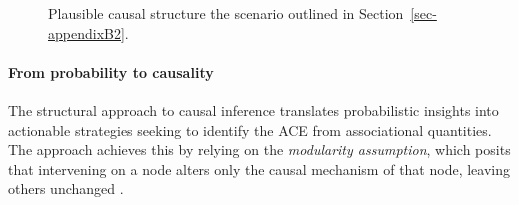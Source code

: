 \documentclass[
  authoryear,
  review,
  1p]{elsarticle}
\let\oldparagraph\paragraph
\renewcommand{\paragraph}[1]{\oldparagraph{#1}\mbox{}}
\begin{document}
\begin{figure}

\begin{minipage}{0.50\linewidth}

\centering{

\[
\begin{aligned}
  X & := x \\
  T & := f_{T}(x,e_{T}) \\
  Y & := f_{Y}(T,x,e_{Y}) \\
  e_{T} & \:\bot\:e_{X} \\
  e_{T} & \:\bot\:e_{Y} \\
  e_{X} & \:\bot\:e_{Y}
\end{aligned}
\]

}


\end{minipage}%
%
\begin{minipage}{0.50\linewidth}



\end{minipage}%

\caption{\label{fig-example2}Plausible causal structure the scenario
outlined in Section~\ref{sec-appendixB2}.}

\end{figure}%

\paragraph{From probability to causality}\label{sec-appendixB33}

The structural approach to causal inference translates probabilistic
insights into actionable strategies seeking to identify the ACE from
associational quantities. The approach achieves this by relying on the
\emph{modularity assumption}, which posits that intervening on a node
alters only the causal mechanism of that node, leaving others unchanged
\citep[p.~34]{Neal_2020}.
\end{document}
